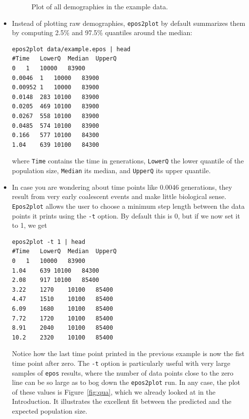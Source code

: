 \documentclass[a4paper]{article}
\newcommand{\ty}{\texttt}
\begin{document}
\begin{itemize}
\begin{figure}
\begin{center}
\end{center}
\caption{Plot of all demographies in the example data.}\label{fig:all}
\end{figure}

\item  Instead of plotting raw demographies, \ty{epos2plot} by default
  summarizes them by computing 2.5\% and 97.5\% quantiles around the
  median:
\begin{verbatim}
epos2plot data/example.epos | head
#Time	LowerQ	Median	UpperQ
0	1	10000	83900
0.0046	1	10000	83900
0.00952	1	10000	83900
0.0148	283	10100	83900
0.0205	469	10100	83900
0.0267	558	10100	83900
0.0485	574	10100	83900
0.166	577	10100	84300
1.04	639	10100	84300
\end{verbatim}
where \ty{Time} contains the time in generations, \ty{LowerQ} the
lower quantile of the population size, \ty{Median} its median, and
\ty{UpperQ} its upper quantile.

\item In case you are wondering about time points like 0.0046
  generations, they result from very early coalescent events and make
  little biological sense. \ty{Epos2plot} allows the user to choose a
  minimum step length between the data points it prints using the
  \ty{-t} option. By default this is 0, but if we now set it to 1, we
  get
\begin{verbatim}
epos2plot -t 1 | head
#Time	LowerQ	Median	UpperQ
0	1	10000	83900
1.04	639	10100	84300
2.08	917	10100	85400
3.22	1270	10100	85400
4.47	1510	10100	85400
6.09	1680	10100	85400
7.72	1720	10100	85400
8.91	2040	10100	85400
10.2	2320	10100	85400
\end{verbatim}
Notice how the last time point printed in the previous example is now
the fist time point after zero. The \ty{-t} option is particularly
useful with very large samples of \ty{epos} results, where the number
of data points close to the zero line can be so large as to bog down
the \ty{epos2plot} run.  In any case, the plot of these values is
Figure~\ref{fig:qua}, which we already looked at in the
Introduction. It illustrates the excellent fit between the predicted
and the expected population size.
\end{itemize}


\end{document}
